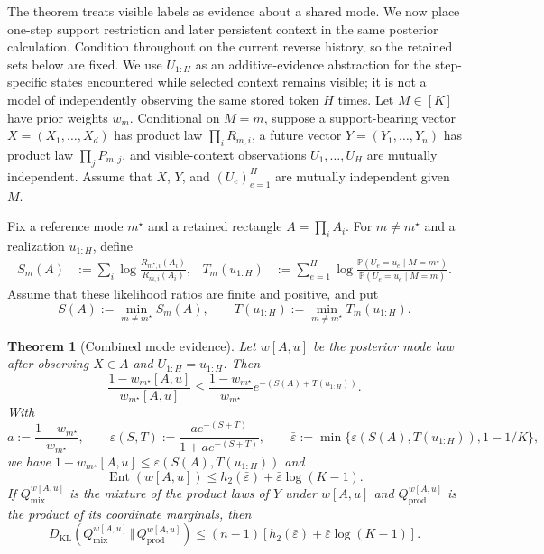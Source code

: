 \documentclass{article}
\newcommand{\KL}{D_{\mathrm{KL}}}
\newcommand{\kldiv}{\,\Vert\,}
\newcommand{\Ent}{\operatorname{Ent}}
\newcommand{\1}{\mathbf 1}
\newtheorem{theorem}{Theorem}
\theoremstyle{definition}
\begin{document}
The theorem treats visible labels as evidence about a shared mode. We now place
one-step support restriction and later persistent context in the same posterior
calculation. Condition throughout on the current reverse history, so the
retained sets below are fixed. We use $U_{1:H}$ as an additive-evidence
abstraction for the step-specific states encountered while selected context
remains visible; it is not a model of independently observing the same stored
token $H$ times. Let $M\in[K]$ have prior weights $w_m$. Conditional on $M=m$,
suppose a support-bearing vector $X=(X_1,\ldots,X_d)$ has product law
$\prod_iR_{m,i}$, a future vector $Y=(Y_1,\ldots,Y_n)$ has product law
$\prod_jP_{m,j}$, and visible-context observations $U_1,\ldots,U_H$ are
mutually independent. Assume that $X$, $Y$, and $(U_e)_{e=1}^H$ are mutually
independent given $M$.

Fix a reference mode $m^\star$ and a retained rectangle $A=\prod_iA_i$. For
$m\ne m^\star$ and a realization $u_{1:H}$, define
\begin{align}
 S_m(A)
 &:=\sum_i\log\frac{R_{m^\star,i}(A_i)}{R_{m,i}(A_i)},
 &
 T_m(u_{1:H})
 &:=\sum_{e=1}^H
 \log\frac{\mathbb P(U_e=u_e\mid M=m^\star)}
 {\mathbb P(U_e=u_e\mid M=m)}.
 \label{eq:combined-evidence-parts-app}
\end{align}
Assume that these likelihood ratios are finite and positive, and put
\begin{equation}
 S(A):=\min_{m\ne m^\star}S_m(A),
 \qquad
 T(u_{1:H}):=\min_{m\ne m^\star}T_m(u_{1:H}).
 \label{eq:combined-evidence-minima-app}
\end{equation}

\begin{theorem}[Combined mode evidence]
\label{thm:combined-evidence}
Let $w[A,u]$ be the posterior mode law after observing $X\in A$ and
$U_{1:H}=u_{1:H}$. Then
\begin{equation}
 \frac{1-w_{m^\star}[A,u]}{w_{m^\star}[A,u]}
 \le
 \frac{1-w_{m^\star}}{w_{m^\star}}
 e^{-(S(A)+T(u_{1:H}))}.
 \label{eq:combined-odds-app}
\end{equation}
With
\begin{equation}
 a:=\frac{1-w_{m^\star}}{w_{m^\star}},
 \qquad
 \varepsilon(S,T):=\frac{ae^{-(S+T)}}{1+ae^{-(S+T)}},
 \qquad
 \bar\varepsilon:=\min\{\varepsilon(S(A),T(u_{1:H})),1-1/K\},
 \label{eq:combined-error-app}
\end{equation}
we have
$1-w_{m^\star}[A,u]\le\varepsilon(S(A),T(u_{1:H}))$ and
\begin{equation}
 \Ent(w[A,u])
 \le h_2(\bar\varepsilon)+\bar\varepsilon\log(K-1).
 \label{eq:combined-entropy-app}
\end{equation}
If $Q_{\mathrm{mix}}^{w[A,u]}$ is the mixture of the product laws of $Y$ under
$w[A,u]$ and $Q_{\mathrm{prod}}^{w[A,u]}$ is the product of its coordinate
marginals, then
\begin{equation}
 \KL(Q_{\mathrm{mix}}^{w[A,u]}\kldiv Q_{\mathrm{prod}}^{w[A,u]})
 \le(n-1)
 \left[h_2(\bar\varepsilon)+\bar\varepsilon\log(K-1)\right].
 \label{eq:combined-gap-app}
\end{equation}
\end{theorem}
\end{document}
